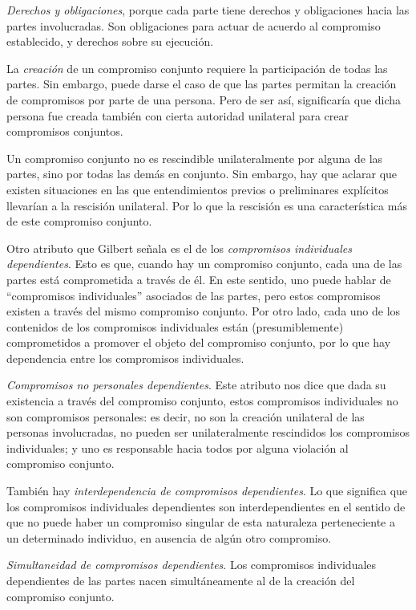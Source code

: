 \documentclass[oneside]{book}
\begin{document}
\textit{Derechos y obligaciones}, porque cada parte tiene derechos y obligaciones hacia las partes involucradas. Son obligaciones para actuar de acuerdo al compromiso establecido, y derechos sobre su ejecución. 

La \textit{creación} de un compromiso conjunto requiere la participación de todas las partes. Sin embargo, puede darse el caso de que las partes permitan la creación de compromisos por parte de una persona. Pero de ser así, significaría que dicha persona fue creada también con cierta autoridad unilateral para crear compromisos conjuntos.

Un compromiso conjunto no es rescindible unilateralmente por alguna de las partes, sino por todas las demás en conjunto. Sin embargo, hay que aclarar que existen situaciones en las que entendimientos previos o preliminares explícitos llevarían a la rescisión unilateral. Por lo que la rescisión es una característica más de este compromiso conjunto.

Otro atributo que Gilbert señala es el de los \textit{compromisos individuales dependientes}. Esto es que, cuando hay un compromiso conjunto, cada una de las partes está comprometida a través de él. En este sentido, uno puede hablar de “compromisos individuales” asociados de las partes, pero estos compromisos existen a través del mismo compromiso conjunto. Por otro lado, cada uno de los contenidos de los compromisos individuales están (presumiblemente) comprometidos a promover el objeto del compromiso conjunto, por lo que hay dependencia entre los compromisos individuales.

\textit{Compromisos no personales dependientes}. Este atributo nos dice que dada su existencia a través del compromiso conjunto, estos compromisos individuales no son compromisos personales: es decir, no son la creación unilateral de las personas involucradas, no pueden ser unilateralmente rescindidos los compromisos individuales; y uno es responsable hacia todos por alguna violación al compromiso conjunto.

También hay \textit{interdependencia de compromisos dependientes}. Lo que significa que los compromisos individuales dependientes son interdependientes en el sentido de que no puede haber un compromiso singular de esta naturaleza perteneciente a un determinado individuo, en ausencia de algún otro compromiso.

\textit{Simultaneidad de compromisos dependientes}. Los compromisos individuales dependientes de las partes nacen simultáneamente al de la creación del compromiso conjunto.
\end{document}
